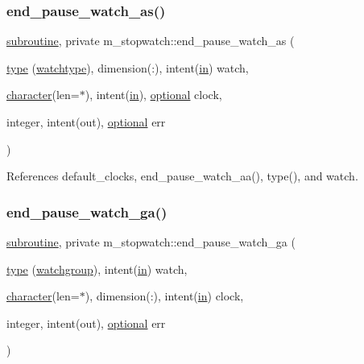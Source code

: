\subsubsection{\texorpdfstring{end\+\_\+pause\+\_\+watch\+\_\+as()}{end\_pause\_watch\_as()}}
{\footnotesize\ttfamily \hyperlink{M__stopwatch_83_8txt_acfbcff50169d691ff02d4a123ed70482}{subroutine}, private m\+\_\+stopwatch\+::end\+\_\+pause\+\_\+watch\+\_\+as (\begin{DoxyParamCaption}\item[{\hyperlink{stop__watch_83_8txt_a70f0ead91c32e25323c03265aa302c1c}{type} (\hyperlink{structm__stopwatch_1_1watchtype}{watchtype}), dimension(\+:), intent(\hyperlink{M__journal_83_8txt_afce72651d1eed785a2132bee863b2f38}{in})}]{watch,  }\item[{\hyperlink{option__stopwatch_83_8txt_abd4b21fbbd175834027b5224bfe97e66}{character}(len=$\ast$), intent(\hyperlink{M__journal_83_8txt_afce72651d1eed785a2132bee863b2f38}{in}), \hyperlink{option__stopwatch_83_8txt_aa4ece75e7acf58a4843f70fe18c3ade5}{optional}}]{clock,  }\item[{integer, intent(out), \hyperlink{option__stopwatch_83_8txt_aa4ece75e7acf58a4843f70fe18c3ade5}{optional}}]{err }\end{DoxyParamCaption})\hspace{0.3cm}{\ttfamily [private]}}



References default\+\_\+clocks, end\+\_\+pause\+\_\+watch\+\_\+aa(), type(), and watch.

\mbox{\label{namespacem__stopwatch_a9b7a584834f64f147b50fafd7574ef61}} 
\subsubsection{\texorpdfstring{end\+\_\+pause\+\_\+watch\+\_\+ga()}{end\_pause\_watch\_ga()}}
{\footnotesize\ttfamily \hyperlink{M__stopwatch_83_8txt_acfbcff50169d691ff02d4a123ed70482}{subroutine}, private m\+\_\+stopwatch\+::end\+\_\+pause\+\_\+watch\+\_\+ga (\begin{DoxyParamCaption}\item[{\hyperlink{stop__watch_83_8txt_a70f0ead91c32e25323c03265aa302c1c}{type} (\hyperlink{structm__stopwatch_1_1watchgroup}{watchgroup}), intent(\hyperlink{M__journal_83_8txt_afce72651d1eed785a2132bee863b2f38}{in})}]{watch,  }\item[{\hyperlink{option__stopwatch_83_8txt_abd4b21fbbd175834027b5224bfe97e66}{character}(len=$\ast$), dimension(\+:), intent(\hyperlink{M__journal_83_8txt_afce72651d1eed785a2132bee863b2f38}{in})}]{clock,  }\item[{integer, intent(out), \hyperlink{option__stopwatch_83_8txt_aa4ece75e7acf58a4843f70fe18c3ade5}{optional}}]{err }\end{DoxyParamCaption})\hspace{0.3cm}{\ttfamily [private]}}



